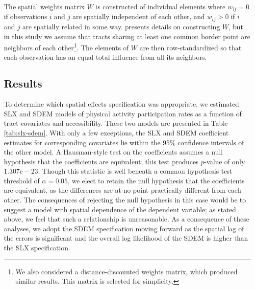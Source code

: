 \documentclass[shortAfour,sageh.bst]{sagej}
\begin{document}
The spatial weights matrix \(W\) is constructed of individual elements
where \(w_{ij} = 0\) if observations \(i\) and \(j\) are spatially
independent of each other, and \(w_{ij} > 0\) if \(i\) and \(j\) are
spatially related in some way. \citet{Dubin1998} presents details on
constructing \(W\), but in this study we assume that tracts sharing at
least one common border point are neighbors of each other\footnote{We
  also considered a distance-discounted weights matrix, which produced
  similar results. This matrix is selected for simplicity.}. The
elements of \(W\) are then row-standardized so that each observation has
an equal total influence from all its neighbors.

\hypertarget{results}{%
\subsection{Results}\label{results}}

To determine which spatial effects specification was appropriate, we
estimated SLX and SDEM models of physical activity participation rates
as a function of tract covariates and accessibility. These two models
are presented in Table \ref{tab:slx-sdem}. With only a few exceptions,
the SLX and SDEM coefficient estimates for corresponding covariates lie
within the 95\% confidence intervals of the other model. A Hausman-style
test \citep{Pace2008} on the coefficients assumes a null hypothesis that
the coefficients are equivalent; this test produces \(p\)-value of only
\(1.307e-23\). Though this statistic is well beneath a common hypothesis
test threshold of \(\alpha = 0.05\), we elect to retain the null hypothesis
that the coefficients are equivalent, as the differences are at no point
practically different from each other. The consequences of rejecting the
null hypothesis in this case would be to suggest a model with spatial
dependence of the dependent variable; as stated above, we feel that such
a relationship is unreasonable. As a consequence of these analyses, we
adopt the SDEM specification moving forward as the spatial lag of the
errors is significant and the overall log likelihood of the SDEM is
higher than the SLX specification.
\end{document}
